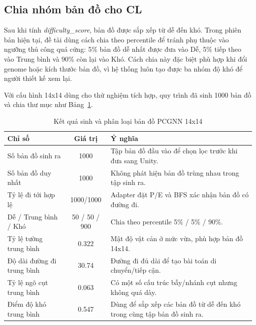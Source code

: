 \subsection{Chia nhóm bản đồ cho CL}

Sau khi tính \emph{difficulty\_score}, bản đồ được sắp xếp từ dễ đến khó. Trong phiên bản hiện tại, đề tài dùng cách chia theo percentile để tránh phụ thuộc vào ngưỡng thủ công quá cứng: 5\% bản đồ dễ nhất được đưa vào Dễ, 5\% tiếp theo vào Trung bình và 90\% còn lại vào Khó. Cách chia này đặc biệt phù hợp khi đổi genome hoặc kích thước bản đồ, vì hệ thống luôn tạo được ba nhóm độ khó để người thiết kế xem lại.

Với cấu hình 14x14 dùng cho thử nghiệm tích hợp, quy trình đã sinh 1000 bản đồ và chia thư mục như Bảng~\ref{tab:pcgnn_map_generation_summary}.

\begin{table}[H]
    \centering
    \small
    \caption{Kết quả sinh và phân loại bản đồ PCGNN 14x14}
    \label{tab:pcgnn_map_generation_summary}
    \begin{tabular}{|p{5cm}|c|p{6.7cm}|}
        \hline
        \textbf{Chỉ số} & \textbf{Giá trị} & \textbf{Ý nghĩa} \\
        \hline
        Số bản đồ sinh ra & 1000 & Tập bản đồ đầu vào để chọn lọc trước khi đưa sang Unity. \\
        \hline
        Số bản đồ duy nhất & 1000 & Không phát hiện bản đồ trùng nhau trong tập sinh ra. \\
        \hline
        Tỷ lệ đi tới hợp lệ & 1000/1000 & Adapter đặt P/E và BFS xác nhận bản đồ có đường đi. \\
        \hline
        Dễ / Trung bình / Khó & 50 / 50 / 900 & Chia theo percentile 5\% / 5\% / 90\%. \\
        \hline
        Tỷ lệ tường trung bình & 0.322 & Mật độ vật cản ở mức vừa, phù hợp bản đồ 14x14. \\
        \hline
        Độ dài đường đi trung bình & 30.74 & Đường đi đủ dài để tạo bài toán di chuyển/tiếp cận. \\
        \hline
        Tỷ lệ ngõ cụt trung bình & 0.063 & Có một số cấu trúc bẫy/nhánh cụt nhưng không quá dày. \\
        \hline
        Điểm độ khó trung bình & 0.547 & Dùng để sắp xếp các bản đồ từ dễ đến khó trong cùng tập bản đồ sinh ra. \\
        \hline
    \end{tabular}
\end{table}

